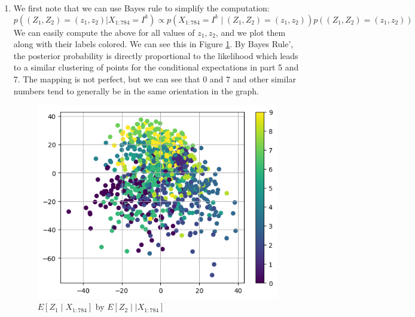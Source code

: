 \documentclass[12pt]{article}
\begin{document}
\begin{enumerate}
\item We first note that we can use Bayes rule to simplify the computation:
$$
p((Z_1, Z_2) = (z_1, z_2)|X_{1:784} = I^k) \propto p(X_{1:784} = I^k \mid (Z_1, Z_2) = (z_1, z_2))p((Z_1, Z_2) = (z_1, z_2))
$$
We can easily compute the above for all values of $z_1, z_2$, and we plot them along with their labels colored. We can see this in Figure \ref{fig:plot}. By Bayes Rule’, the posterior probability is directly proportional to the likelihood which leads
to a similar clustering of points for the conditional expectations in part 5 and 7. The mapping is not perfect, but we can see that $0$ and $7$ and other similar numbers tend to generally be in the same orientation in the graph.

\begin{figure}[h!]
\centering
\includegraphics[scale=0.8]{programming/a7.png}
\caption{$E[Z_1 \mid X_{1:784}]$ by $E[Z_2 \mid \mid X_{1:784}]$}
\label{fig:plot}
\end{figure}

\end{enumerate}
\end{document}
